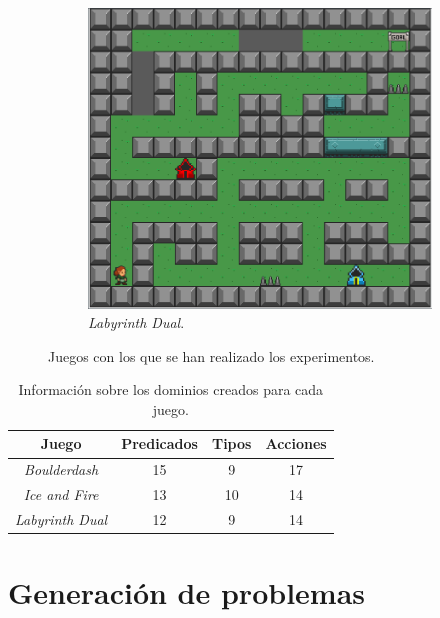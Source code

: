 \begin{figure}[H]
\begin{subfigure}[t]{0.5\textwidth}
        \includegraphics[scale=0.25]{img/CH08/labyrinth_dual.png}
        \caption{\textit{Labyrinth Dual}.}
        \label{fig:labyrinth_dual}
    \end{subfigure}
    \caption{Juegos con los que se han realizado los experimentos.}
    \label{fig:games}
\end{figure}


\begin{table}[H]
\centering
\begin{tabular}{|c|ccc|}
\hline
\textbf{Juego} & \textbf{Predicados} & \textbf{Tipos} & \textbf{Acciones} \\ \hline
\textit{Boulderdash} & 15 & 9 & 17 \\ \hline
\textit{Ice and Fire} & 13 & 10 & 14 \\ \hline
\textit{Labyrinth Dual} & 12 & 9 & 14 \\ \hline
\end{tabular}
\caption{Información sobre los dominios creados para cada juego.}
\label{tab:info-domains}
\end{table}


\section{Generación de problemas}

